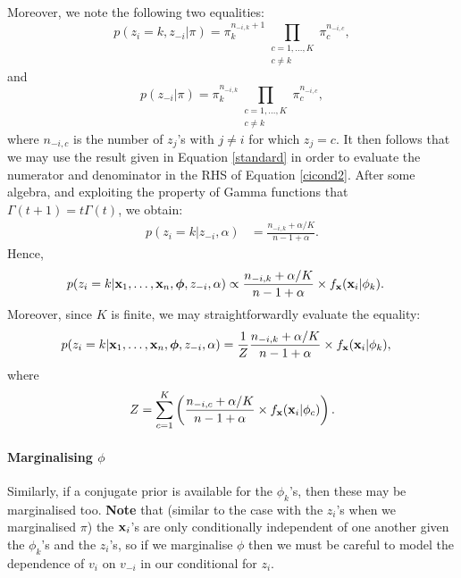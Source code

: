 \documentclass[12pt]{article}
\begin{document}
Moreover, we note the following two equalities: 
$$p(z_i = k, z_{-i}| \pi) = \pi_k^{n_{-i,k} + 1}\prod_{\substack{c= 1,\ldots,K\\
                  c \ne k}} \pi_c^{n_{-i,c}}, $$
                  and
$$p(z_{-i}| \pi) = \pi_k^{n_{-i,k}}\prod_{\substack{c= 1,\ldots,K\\
                  c \ne k}} \pi_c^{n_{-i,c}}, $$
where $n_{-i,c}$ is the number of $z_j$'s with $j \ne i$ for which $z_j = c$.  It then follows that we may use the result given in Equation \eqref{standard} in order to evaluate the numerator and denominator in the RHS of Equation \eqref{cicond2}.  After some algebra, and exploiting the property of Gamma functions that $\Gamma(t+1) = t\Gamma(t)$, we obtain:
\begin{align}
p(z_i=k|z_{-i}, \alpha) &= \frac{n_{-i,k} + \alpha/K}{n - 1 + \alpha}. \label{cicond3}  
\end{align}
Hence,
\begin{align}
p(z_i = k| {\bf x}_1,\ldots, {\bf x}_n,\boldsymbol{\phi}, z_{-i}, \alpha) &\propto  \frac{n_{-i,k} + \alpha/K}{n - 1 + \alpha} \times f_{\bf x}({\bf x}_i | \phi_k).
\end{align}
Moreover, since $K$ is finite, we may straightforwardly evaluate the equality:
\begin{align}
p(z_i = k| {\bf x}_1,\ldots, {\bf x}_n,\boldsymbol{\phi}, z_{-i}, \alpha) &= \frac{1}{Z} \frac{n_{-i,k} + \alpha/K}{n - 1 + \alpha} \times f_{\bf x}({\bf x}_i | \phi_k),\label{finite_nomarg}
\end{align} 
where
\begin{equation}
Z = \sum_{c =1}^K \left(\frac{n_{-i,c} + \alpha/K}{n - 1 + \alpha} \times f_{\bf x}({\bf x}_i | \phi_c)\right).  
\end{equation}

\paragraph{Marginalising $\phi$}
Similarly, if a conjugate prior is available for the $\phi_k$'s, then these may be marginalised too.  {\bf Note} that (similar to the case with the $z_i$'s when we marginalised $\pi$) the ${\bf x}_i$'s are only conditionally independent of one another given the $\phi_k$'s and the $z_i$'s, so if we marginalise $\phi$ then we must be careful to model the dependence of $v_i$ on $v_{-i}$ in our conditional for $z_i$.  
\end{document}
